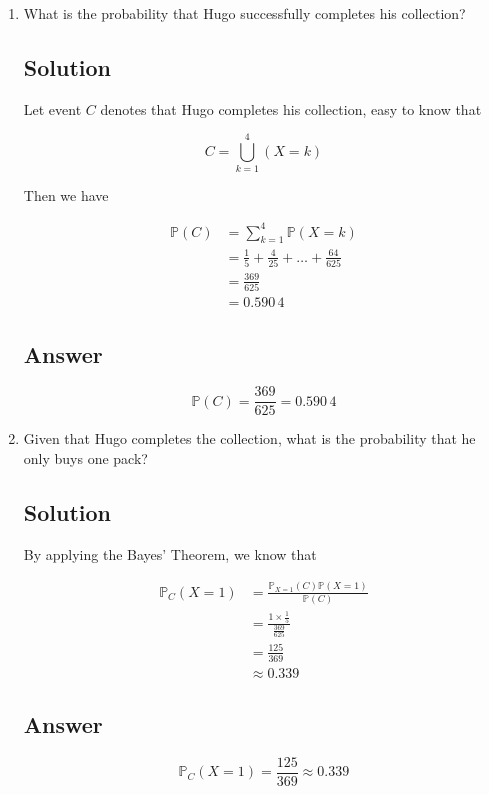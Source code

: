 \documentclass[12pt]{article}
\newcommand{\bP}{\mathbb{P}}
\begin{document}
\begin{enumerate}[start=1,label={\bfseries Part \arabic*:},leftmargin=0in]
		\bigskip\item What is the probability that Hugo successfully completes his collection?
		
		\subsection*{Solution}
		
			Let event $C$ denotes that Hugo completes his collection, easy to know that
			
			\[C = \bigcup_{k=1}^4(X = k)\]
			
			Then we have
			
			\[
				\begin{aligned}
					\bP(C) &= \sum_{k=1}^4\bP(X = k)\\
					&= \frac{1}{5} + \frac{4}{25} +\dots + \frac{64}{625}\\
					&= \frac{369}{625}\\
					&= 0.590\,4
				\end{aligned}
			\]
		
		\subsection*{Answer}
		
			\[\boxed{\bP(C) = \frac{369}{625} = 0.590\,4}\]
			
		\bigskip\item Given that Hugo completes the collection, what is the probability that he only buys one pack?
		
		\subsection*{Solution}
		
			By applying the Bayes’ Theorem, we know that
			
			\[
				\begin{aligned}
					\bP_C(X = 1) &= \frac{\bP_{X = 1}(C)\bP(X = 1)}{\bP(C)}\\
					&= \frac{1\times \frac{1}{5}}{\frac{369}{625}}\\
					&= \frac{125}{369}\\
					&\approx 0.339
				\end{aligned}
			\]
		
		\subsection*{Answer}
		
			\[\boxed{\bP_C(X = 1) = \frac{125}{369} \approx 0.339}\]
	\end{enumerate}
	
\end{document}
